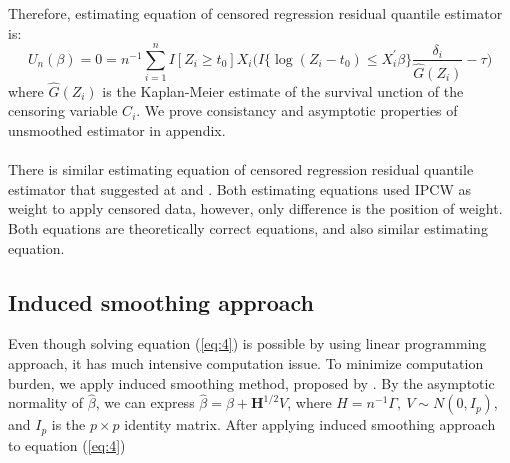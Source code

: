 \documentclass[titlepage,english,12pt]{article}
\begin{document}
	\noindent Therefore, estimating equation of censored regression residual quantile estimator is:
	\begin{equation} \label{eq:4}
	U_n(\beta) = 0 = n^{-1}\sum_{i=1}^{n}I[Z_i \ge t_0] X_i \Big(I\{\log(Z_i - t_0) \leq X_i^{\prime}\beta\} \frac{\delta_i}{\hat{G}(Z_i)}  -\tau \Big)
	\end{equation}
	where $\hat{G}(Z_i)$ is the Kaplan-Meier estimate of the survival unction of the censoring variable $C_i$. We prove consistancy and asymptotic properties of unsmoothed estimator in appendix.\\
	\\
	There is similar estimating equation of censored regression residual quantile estimator that suggested at \citet{pang2012variance} and \citet{kim2012censored}. Both estimating equations used IPCW as weight to apply censored data, however, only difference is the position of weight. Both equations are theoretically correct equations, and \citet{peng2009competing} also similar estimating equation.\\

\subsection{Induced smoothing approach}

	\noindent Even though solving equation (\ref{eq:4}) is possible by using linear programming approach, it has much intensive computation issue. To minimize computation burden, we apply induced smoothing method, proposed by \citet{brown2007induced}. By the asymptotic normality of $\hat{\beta}$, we can express $\hat{\beta} = \beta+\textbf{H}^{1/2}V$, where $H = n^{-1}\Gamma,\ V \sim N(0, I_p)$, and $I_p$ is the $p \times p $ identity matrix. After applying induced smoothing approach to equation (\ref{eq:4})
	
\end{document}
